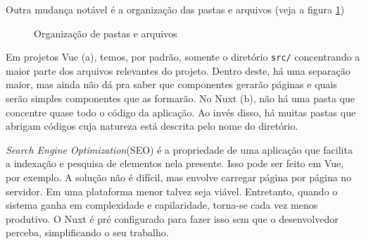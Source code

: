 Outra mudança notável é a organização das pastas e arquivos (veja a figura \ref{fig:file-system})

\begin{figure}[htb]
    \centering
    \caption{Organização de pastas e arquivos}
    \label{fig:file-system}
\end{figure}

Em projetos Vue (a), temos, por padrão, somente o diretório \texttt{src/} concentrando a maior parte
dos arquivos relevantes do projeto. Dentro deste, há uma separação maior, mas ainda não dá pra saber
que componentes gerarão páginas e quais serão simples componentes que as formarão. No Nuxt (b), não
há uma pasta que concentre quase todo o código da aplicação. Ao invés disso, há muitas pastas que
abrigam códigos cuja natureza está descrita pelo nome do diretório.

\emph{Search Engine Optimization}(SEO) é a propriedade de uma aplicação que facilita a  indexação e
pesquisa de elementos nela presente. Isso pode ser feito em Vue, por exemplo. A solução não é
difícil, mas envolve carregar página por página no servidor. Em uma plataforma menor talvez seja
viável. Entretanto, quando o sistema ganha em complexidade e capilaridade, torna-se cada vez menos
produtivo. O Nuxt é pré configurado para fazer isso sem que o desenvolvedor perceba, simplificando o
seu trabalho.

